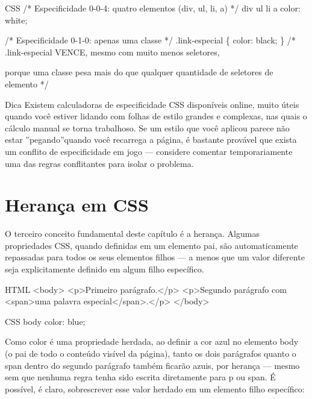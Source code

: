 \begin{codebox}{CSS}
/* Especificidade 0-0-4: quatro elementos (div, ul, li, a) */
div ul li a {
  color: white;
}
\end{codebox}

/* Especificidade 0-1-0: apenas uma classe */ .link-especial \{ color: black; \} /* .link-especial VENCE, mesmo com muito menos seletores,

\begin{infobox}{porque uma classe pesa mais do que qualquer quantidade}
de seletores de elemento */
\end{infobox}

\begin{infobox}{Dica}
Existem calculadoras de especificidade CSS disponíveis online, muito úteis quando você estiver lidando com folhas de estilo grandes e complexas, nas quais o cálculo manual se torna trabalhoso. Se um estilo que você aplicou parece não estar ”pegando”quando você recarrega a página, é bastante provável que exista um conflito de especificidade em jogo — considere comentar temporariamente uma das regras conflitantes para isolar o problema.
\end{infobox}

\section{Herança em CSS}

O terceiro conceito fundamental deste capítulo é a herança. Algumas propriedades CSS, quando definidas em um elemento pai, são automaticamente repassadas para todos os seus elementos filhos — a menos que um valor diferente seja explicitamente definido em algum filho específico.

\begin{codebox}{HTML}
 <body>
   <p>Primeiro parágrafo.</p>
   <p>Segundo parágrafo com <span>uma palavra especial</span>.</p>
 </body>
\end{codebox}

\begin{codebox}{CSS}
 body {
   color: blue;
 }
\end{codebox}

Como color é uma propriedade herdada, ao definir a cor azul no elemento body (o pai de todo o conteúdo visível da página), tanto os dois parágrafos quanto o span dentro do segundo parágrafo também ficarão azuis, por herança — mesmo sem que nenhuma regra tenha sido escrita diretamente para p ou span. É possível, é claro, sobrescrever esse valor herdado em um elemento filho específico:

